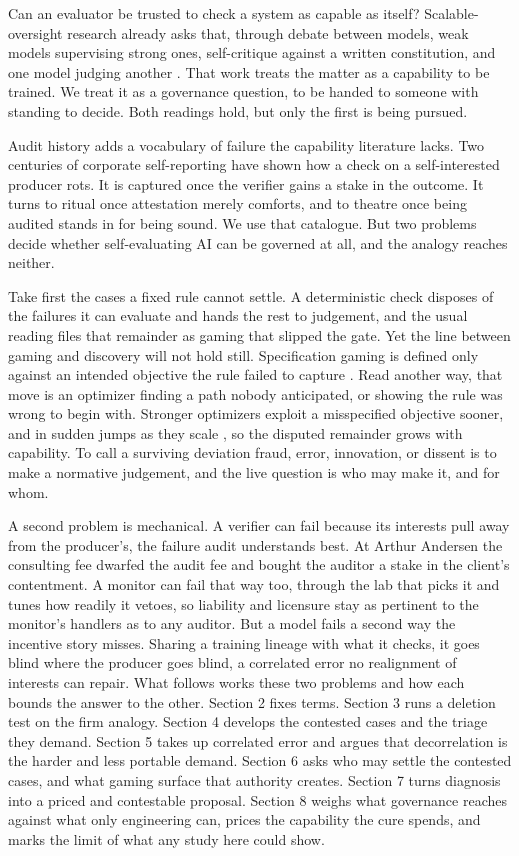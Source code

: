 \documentclass[11pt]{article}
\begin{document}
Can an evaluator be trusted to check a system as capable as itself? Scalable-oversight research already asks that, through debate between models, weak models supervising strong ones, self-critique against a written constitution, and one model judging another \citep{irving2018,burns2023,bai2022,zheng2023}. That work treats the matter as a capability to be trained. We treat it as a governance question, to be handed to someone with standing to decide. Both readings hold, but only the first is being pursued.

Audit history adds a vocabulary of failure the capability literature lacks. Two centuries of corporate self-reporting have shown how a check on a self-interested producer rots. It is captured once the verifier gains a stake in the outcome. It turns to ritual once attestation merely comforts, and to theatre once being audited stands in for being sound. We use that catalogue. But two problems decide whether self-evaluating AI can be governed at all, and the analogy reaches neither.

Take first the cases a fixed rule cannot settle. A deterministic check disposes of the failures it can evaluate and hands the rest to judgement, and the usual reading files that remainder as gaming that slipped the gate. Yet the line between gaming and discovery will not hold still. Specification gaming is defined only against an intended objective the rule failed to capture \citep{krakovna2020,skalse2022}. Read another way, that move is an optimizer finding a path nobody anticipated, or showing the rule was wrong to begin with. Stronger optimizers exploit a misspecified objective sooner, and in sudden jumps as they scale \citep{pan2022}, so the disputed remainder grows with capability. To call a surviving deviation fraud, error, innovation, or dissent is to make a normative judgement, and the live question is who may make it, and for whom.

A second problem is mechanical. A verifier can fail because its interests pull away from the producer's, the failure audit understands best. At Arthur Andersen the consulting fee dwarfed the audit fee and bought the auditor a stake in the client's contentment. A monitor can fail that way too, through the lab that picks it and tunes how readily it vetoes, so liability and licensure stay as pertinent to the monitor's handlers as to any auditor. But a model fails a second way the incentive story misses. Sharing a training lineage with what it checks, it goes blind where the producer goes blind, a correlated error no realignment of interests can repair. What follows works these two problems and how each bounds the answer to the other. Section 2 fixes terms. Section 3 runs a deletion test on the firm analogy. Section 4 develops the contested cases and the triage they demand. Section 5 takes up correlated error and argues that decorrelation is the harder and less portable demand. Section 6 asks who may settle the contested cases, and what gaming surface that authority creates. Section 7 turns diagnosis into a priced and contestable proposal. Section 8 weighs what governance reaches against what only engineering can, prices the capability the cure spends, and marks the limit of what any study here could show.
\end{document}

